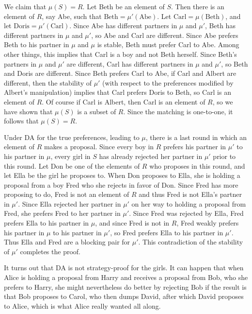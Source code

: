 \documentclass[12pt]{article}
\theoremstyle{definition}
\begin{document}
We claim that $\mu(S) = R$.  Let Beth be an element of $S$.  Then
there is an element of $R$, say Abe, such that $\mathrm{Beth} =
\mu'(\mathrm{Abe})$.  Let $\textrm{Carl} = \mu(\textrm{Beth})$, and
let $\textrm{Doris} = \mu'(\textrm{Carl})$.  Since Abe has different
partners in $\mu$ and $\mu'$, Beth has different partners in $\mu$ and
$\mu'$, so Abe and Carl are different.  Since Abe prefers Beth to his
partner in $\mu$ and $\mu$ is stable, Beth must prefer Carl to Abe.
Among other things, this implies that Carl is a boy and not Beth
herself.  Since Beth's partners in $\mu$ and $\mu'$ are different,
Carl has different partners in $\mu$ and $\mu'$, so Beth and Doris are
different.  Since Beth prefers Carl to Abe, if Carl and Albert are
different, then the stability of $\mu'$ (with respect to the
preferences modified by Albert's manipulation) implies that Carl
prefers Doris to Beth, so Carl is an element of $R$.  Of course if
Carl is Albert, then Carl is an element of $R$, so we have shown that
$\mu(S)$ is a subset of $R$.  Since the matching is one-to-one, it
follows that $\mu(S) = R$.

Under DA for the true preferences, leading to $\mu$, there is a last
round in which an element of $R$ makes a proposal.  Since every boy in
$R$ prefers his partner in $\mu'$ to his partner in $\mu$, every girl
in $S$ has already rejected her partner in $\mu'$ prior to this round.
Let Don be one of the elements of $R$ who proposes in this round, and
let Ella be the girl he proposes to.  When Don proposes to Ella, she
is holding a proposal from a boy Fred who she rejects in favor of Don.
Since Fred has more proposing to do, Fred is not an element of $R$ and
thus Fred is not Ella's partner in $\mu'$.  Since Ella rejected her
partner in $\mu'$ on her way to holding a proposal from Fred, she
prefers Fred to her partner in $\mu'$.  Since Fred was rejected by
Ella, Fred prefers Ella to his partner in $\mu$, and since Fred is not
in $R$, Fred weakly prefers his partner in $\mu$ to his partner in
$\mu'$, so Fred prefers Ella to his partner in $\mu'$.  Thus Ella and
Fred are a blocking pair for $\mu'$.  This contradiction of the
stability of $\mu'$ completes the proof.

It turns out that DA is not strategy-proof for the girls.  It can
happen that when Alice is holding a proposal from Harry and receives a
proposal from Bob, who she prefers to Harry, she might nevertheless do
better by rejecting Bob if the result is that Bob proposes to Carol,
who then dumps David, after which David proposes to Alice, which is
what Alice really wanted all along.
\end{document}

